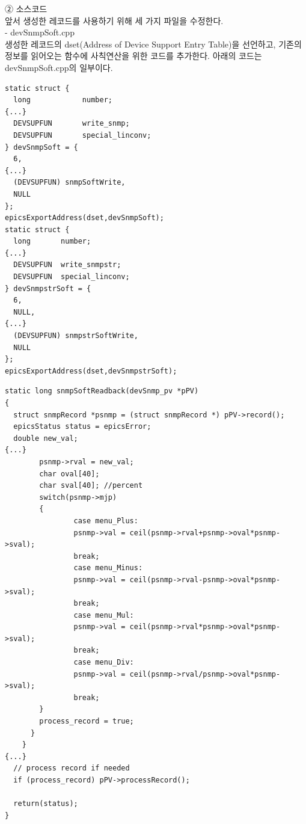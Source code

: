 \documentclass[11pt
  , a4paper
  , article
  , oneside
]{memoir}
\begin{document}
\hfill

②  소스코드\\
앞서 생성한 레코드를 사용하기 위해 세 가지 파일을 수정한다.\\

- devSnmpSoft.cpp\\
생성한 레코드의 dset(Address of Device Support Entry Table)을 선언하고, 기존의 정보를 읽어오는 함수에 사칙연산을 위한 코드를 추가한다. 아래의 코드는 devSnmpSoft.cpp의 일부이다.

{\scriptsize
\begin{lstlisting}[style=termstyle]
static struct {
  long            number;
{...}
  DEVSUPFUN       write_snmp;
  DEVSUPFUN       special_linconv;
} devSnmpSoft = {
  6,
{...}
  (DEVSUPFUN) snmpSoftWrite,
  NULL
};
epicsExportAddress(dset,devSnmpSoft);
static struct {
  long       number;
{...}
  DEVSUPFUN  write_snmpstr;
  DEVSUPFUN  special_linconv;
} devSnmpstrSoft = {
  6,
  NULL,
{...}
  (DEVSUPFUN) snmpstrSoftWrite,
  NULL
};
epicsExportAddress(dset,devSnmpstrSoft);
\end{lstlisting}
}

{\scriptsize
\begin{lstlisting}[style=termstyle]
static long snmpSoftReadback(devSnmp_pv *pPV)
{
  struct snmpRecord *psnmp = (struct snmpRecord *) pPV->record();
  epicsStatus status = epicsError;
  double new_val;
{...}
        psnmp->rval = new_val;
        char oval[40]; 
        char sval[40]; //percent
        switch(psnmp->mjp)
        {
                case menu_Plus: 
                psnmp->val = ceil(psnmp->rval+psnmp->oval*psnmp->sval);
                break;
                case menu_Minus: 
                psnmp->val = ceil(psnmp->rval-psnmp->oval*psnmp->sval);
                break;
                case menu_Mul: 
                psnmp->val = ceil(psnmp->rval*psnmp->oval*psnmp->sval);
                break;
                case menu_Div: 
                psnmp->val = ceil(psnmp->rval/psnmp->oval*psnmp->sval);
                break;
        }
        process_record = true;
      }
    }
{...}
  // process record if needed
  if (process_record) pPV->processRecord();

  return(status);
}
\end{lstlisting}
}

\hfill
\end{document}
